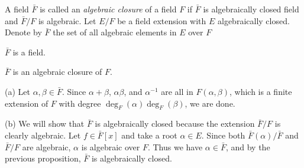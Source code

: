 \documentclass{../../large}
\begin{document}
\begin{prb}
A field $\bar F$ is called an \emph{algebraic closure} of a field $F$ if $\bar F$ is algebraically closed field and $\bar F/F$ is algebraic.
Let $E/F$ be a field extension with $E$ algebraically closed.
Denote by $\bar F$ the set of all algebraic elements in $E$ over $F$
\begin{parts}
\item $\bar F$ is a field.
\item $\bar F$ is an algebraic closure of $F$.
\end{parts}
\end{prb}
\begin{pf}
(a)
Let $\alpha,\beta\in\bar F$.
Since $\alpha+\beta$, $\alpha\beta$, and $\alpha^{-1}$ are all in $F(\alpha,\beta)$, which is a finite extension of $F$ with degree $\deg_F(\alpha)\deg_F(\beta)$, we are done.

(b)
We will show that $\bar F$ is algebraically closed because the extension $\bar F/F$ is clearly algebraic.
Let $f\in\bar F[x]$ and take a root $\alpha\in E$.
Since both $\bar F(\alpha)/\bar F$ and $\bar F/F$ are algebraic, $\alpha$ is algebraic over $F$.
Thus we have $\alpha\in\bar F$, and by the previous proposition, $\bar F$ is algebraically closed.
\end{pf}
\end{document}

